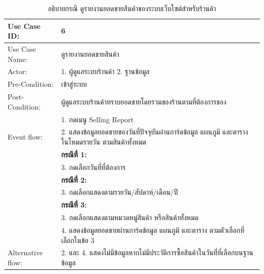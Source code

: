 \begin{table}[htbp]
  \centering
  \caption{อธิบายกรณี ดูรายงานยอดขายสินค้าของระบบเว็บไซต์สำหรับร้านค้า}
  \label{tab:example}
  \begin{tabularx}{\textwidth}{|p{3cm}|X|}
    \hline
    \multirow{1}{3cm}{Use Case ID:}      & 6                                                                               \\
    \hline
    \multirow{1}{3cm}{Use Case Name:}    & ดูรายงานยอดขายสินค้า                                                               \\
    \hline
    \multirow{1}{3cm}{Actor:}            & 1. ผู้ดูแลระบบร้านค้า  2. ฐานข้อมูล                                                    \\
    \hline
    \multirow{1}{3cm}{Pre-Condition:}    & เข้าสู่ระบบ                                                                        \\
    \hline
    \multirow{1}{3cm}{Post-Condition:}   & ผู้ดูแลระบบร้านค้าทราบยอดขายโดยรวมของร้านตามที่ต้องการของ                                \\
    \hline
    \multirow{3}{3cm}{Event flow:}       & 1. กดเมนู Selling Report                                                         \\
                                         & 2. แสดงข้อมูลยอดขายของวันที่ปัจจุบันผ่านการ์ดข้อมูล แผนภูมิ และตาราง ในโหมดรายวัน ตามสินค้าทั้งหมด \\
                                         & \textbf{กรณีที่ 1:}                                                                \\ & 3. กดเลือกวันที่ที่ต้องการ \\
                                         & \textbf{กรณีที่ 2:}                                                                \\ & 3. กดเลือกแสดงตามรายวัน/สัปดาห์/เดือน/ปี \\
                                         & \textbf{กรณีที่ 3:}                                                                \\ & 3. กดเลือกแสดงตามหมวดหมู่สินค้า หรือสินค้าทั้งหมด \\
                                         & 4. แสดงข้อมูลยอดขายผ่านการ์ดข้อมูล แผนภูมิ และตาราง ตามตัวเลือกที่เลือกในข้อ 3                \\
    \hline
    \multirow{1}{3cm}{Alternative flow:} & 2. และ 4. แสดงไม่มีข้อมูลหากไม่มีประวัติการซื้อสินค้าในวันที่ที่เลือกบนฐานข้อมูล                    \\
    \hline
  \end{tabularx}
\end{table}

